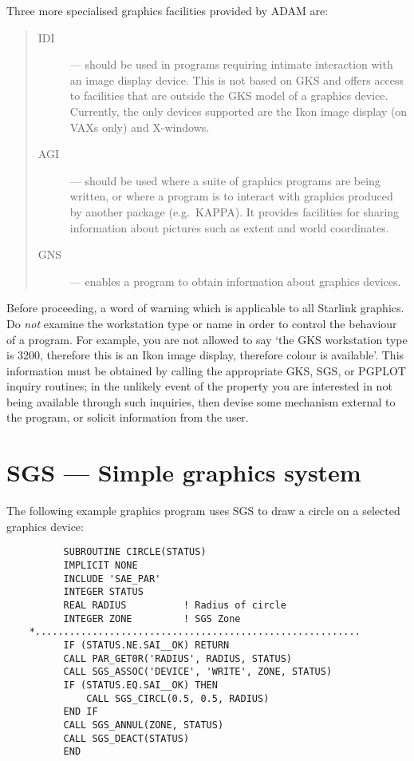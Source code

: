 Three more specialised graphics facilities provided by ADAM are:

\begin{quote}
\begin{description}

\item [IDI] --- should be used in programs requiring intimate interaction with
an image display device.
This is not based on GKS and offers access to facilities that are outside the
GKS model of a graphics device.
Currently, the only devices supported are the Ikon image display (on VAXs
only) and X-windows.

\item [AGI] --- should be used where a suite of graphics programs are being
written, or where a program is to interact with graphics produced by another
package (e.g.\ KAPPA).
It provides facilities for sharing information about pictures such as extent
and world coordinates.

\item [GNS] --- enables a program to obtain information about graphics devices.

\end{description}
\end{quote}

Before proceeding, a word of warning which is applicable to all Starlink
graphics.
Do {\em not} examine the workstation type or name in order to control the
behaviour of a program.
For example, you are not allowed to say `the GKS workstation type is 3200,
therefore this is an Ikon image display, therefore colour is available'.
This information must be obtained by calling the appropriate GKS, SGS, or
\mbox{PGPLOT} inquiry routines;  in the unlikely event of the property you are
interested in not being available through such inquiries, then devise some
mechanism external to the program, or solicit information from the user.

\section{SGS --- Simple graphics system}
\label{S_sgsgks}

The following example graphics program uses SGS to draw a circle on a selected
graphics device:

\begin{small}
\begin{verbatim}
          SUBROUTINE CIRCLE(STATUS)
          IMPLICIT NONE
          INCLUDE 'SAE_PAR'
          INTEGER STATUS
          REAL RADIUS          ! Radius of circle
          INTEGER ZONE         ! SGS Zone
    *.........................................................
          IF (STATUS.NE.SAI__OK) RETURN
          CALL PAR_GET0R('RADIUS', RADIUS, STATUS)
          CALL SGS_ASSOC('DEVICE', 'WRITE', ZONE, STATUS)
          IF (STATUS.EQ.SAI__OK) THEN
              CALL SGS_CIRCL(0.5, 0.5, RADIUS)
          END IF
          CALL SGS_ANNUL(ZONE, STATUS)
          CALL SGS_DEACT(STATUS)
          END
\end{verbatim}
\end{small}

